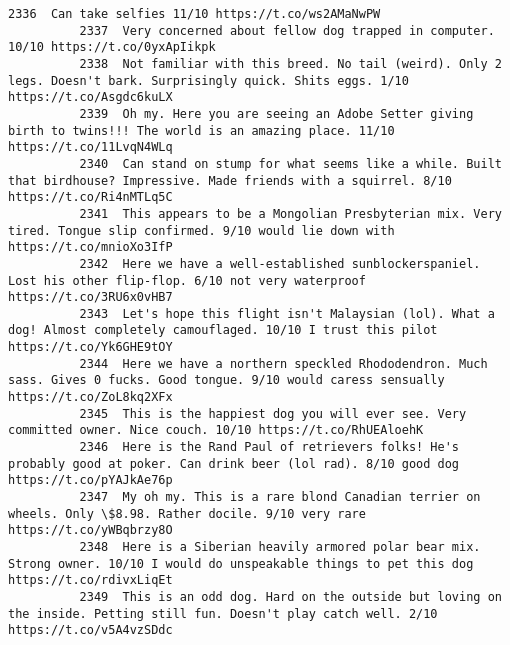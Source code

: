\documentclass[11pt]{article}
\begin{document}
\begin{Verbatim}[commandchars=\\\{\}]
          2336  Can take selfies 11/10 https://t.co/ws2AMaNwPW                                                                                                                           
          2337  Very concerned about fellow dog trapped in computer. 10/10 https://t.co/0yxApIikpk                                                                                       
          2338  Not familiar with this breed. No tail (weird). Only 2 legs. Doesn't bark. Surprisingly quick. Shits eggs. 1/10 https://t.co/Asgdc6kuLX                                   
          2339  Oh my. Here you are seeing an Adobe Setter giving birth to twins!!! The world is an amazing place. 11/10 https://t.co/11LvqN4WLq                                         
          2340  Can stand on stump for what seems like a while. Built that birdhouse? Impressive. Made friends with a squirrel. 8/10 https://t.co/Ri4nMTLq5C                             
          2341  This appears to be a Mongolian Presbyterian mix. Very tired. Tongue slip confirmed. 9/10 would lie down with https://t.co/mnioXo3IfP                                     
          2342  Here we have a well-established sunblockerspaniel. Lost his other flip-flop. 6/10 not very waterproof https://t.co/3RU6x0vHB7                                            
          2343  Let's hope this flight isn't Malaysian (lol). What a dog! Almost completely camouflaged. 10/10 I trust this pilot https://t.co/Yk6GHE9tOY                                
          2344  Here we have a northern speckled Rhododendron. Much sass. Gives 0 fucks. Good tongue. 9/10 would caress sensually https://t.co/ZoL8kq2XFx                                
          2345  This is the happiest dog you will ever see. Very committed owner. Nice couch. 10/10 https://t.co/RhUEAloehK                                                              
          2346  Here is the Rand Paul of retrievers folks! He's probably good at poker. Can drink beer (lol rad). 8/10 good dog https://t.co/pYAJkAe76p                                  
          2347  My oh my. This is a rare blond Canadian terrier on wheels. Only \$8.98. Rather docile. 9/10 very rare https://t.co/yWBqbrzy8O                                             
          2348  Here is a Siberian heavily armored polar bear mix. Strong owner. 10/10 I would do unspeakable things to pet this dog https://t.co/rdivxLiqEt                             
          2349  This is an odd dog. Hard on the outside but loving on the inside. Petting still fun. Doesn't play catch well. 2/10 https://t.co/v5A4vzSDdc                               

\end{Verbatim}
\end{document}
